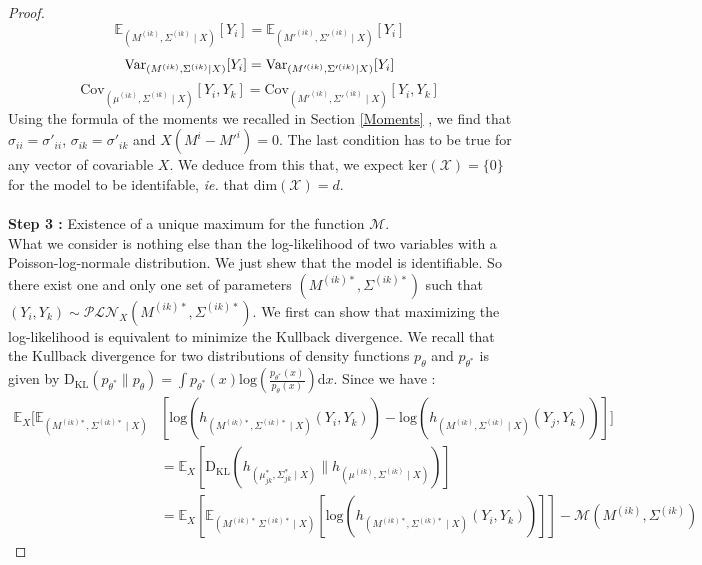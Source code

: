 \documentclass[11pt, a4paper]{article}
\begin{document}
\begin{proof}
 \begin{equation}
 \mathbb{E}_{(M^{(ik)},\Sigma^{(ik)} \mid X)}[Y_i]=\mathbb{E}_{(M'^{(ik)},\Sigma'^{(ik)} \mid X)} [Y_i] 
 \end{equation}
\begin{equation}
 \mathrm{Var}_{(M^{(ik)},\Sigma^{(ik)} \mid X)}[Y_i]=\mathrm{Var}_{(M'^{(ik)},\Sigma'^{(ik)} \mid X)} [Y_i] \\
\end{equation}
\begin{equation}
 \mathrm{Cov}_{(\mu^{(ik)},\Sigma^{(ik)} \mid X)}[Y_i,Y_k]=\mathrm{Cov}_{(M'^{(ik)},\Sigma'^{(ik)} \mid X)} [Y_i,Y_k]
\end{equation}
Using the formula of the moments we recalled in Section \ref{Moments} , we find that $\sigma_{ii} = \sigma'_{ii}$, $\sigma_{ik}=\sigma'_{ik}$ and $X (M^i-M'^i)=0$. The last condition has to be true for any vector of covariable $X$. We deduce from this that,  we expect $\mathrm{ker}(\mathcal{X}) = \{0\}$ for the model to be identifable, \textit{ie.} that $\mathrm{dim}(\mathcal{X})=d$.\\
\\
\textbf{Step 3 :} Existence of a unique maximum for the function $\mathcal{M}$.\\
What we consider is nothing else than the log-likelihood of two variables with a Poisson-log-normale distribution. We just shew that the model is identifiable. So there exist one and only one set of parameters $(M^{(ik)\ast}, \Sigma^{(ik)\ast})$ such that $(Y_i,Y_k) \sim \mathcal{PLN}_X(M^{(ik)\ast},\Sigma^{(ik)\ast})$. We first can show that maximizing the log-likelihood is equivalent to minimize the Kullback divergence. We recall that the Kullback divergence for two distributions of density functions $p_\theta$ and $p_{\theta^\ast}$ is given by $\mathrm{D_{KL}}(p_{\theta^\ast} \parallel p_{\theta})= \int p_{\theta^\ast}(x) \mathrm{log}(\frac{p_{\theta^\ast}(x)}{p_{\theta}(x)}) \mathrm{d}x$. Since we have :
\begin{align*}
\mathbb{E}_X[\mathbb{E}_{(M^{(ik)\ast},\Sigma^{(ik)\ast} \mid X)}&[\mathrm{log}(h_{(M^{(ik)\ast},\Sigma^{(ik)\ast} \mid X)}(Y_i,Y_k)) - \mathrm{log}(h_{(M^{(ik)},\Sigma^{(ik)} \mid X)}(Y_j,Y_k))]] \\
& = \mathbb{E}_X[\mathrm{D_{KL}}(h_{(\mu_{jk}^\ast,\Sigma_{jk}^\ast \mid X)}\parallel h_{(\mu^{(ik)},\Sigma^{(ik)} \mid X)})]\\
& = \mathbb{E}_X[\mathbb{E}_{(M^{(ik)\ast}\,\Sigma^{(ik)\ast} \mid X)}[\mathrm{log}(h_{(M^{(ik)\ast},\Sigma^{(ik)\ast} \mid X)}(Y_i,Y_k))]] - \mathcal{M}(M^{(ik)},\Sigma^{(ik)})

\end{align*}
\end{proof}
\end{document}
